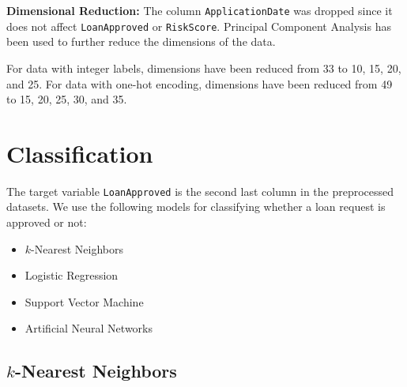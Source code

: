 \documentclass[12pt]{report}
\begin{document}
{}
\noindent\textbf{Dimensional Reduction:}
The column \texttt{ApplicationDate} was dropped since it does not affect \texttt{LoanApproved} or \texttt{RiskScore}. Principal Component Analysis has been used to further reduce the dimensions of the data.

For data with integer labels, dimensions have been reduced from 33 to 10, 15, 20, and 25. For data with one-hot encoding, dimensions have been reduced from 49 to 15, 20, 25, 30, and 35.

\newpage
\noindent{}
\noindent{}
\noindent{}
\noindent{}

\newpage
\chapter{Classification}
The target variable \texttt{LoanApproved} is the second last column in the preprocessed datasets. We use the following models for classifying whether a loan request is approved or not:
\begin{itemize}
    \item $k$-Nearest Neighbors
    \item Logistic Regression
    \item Support Vector Machine
    \item Artificial Neural Networks
\end{itemize}

\section*{$k$-Nearest Neighbors}
\end{document}
